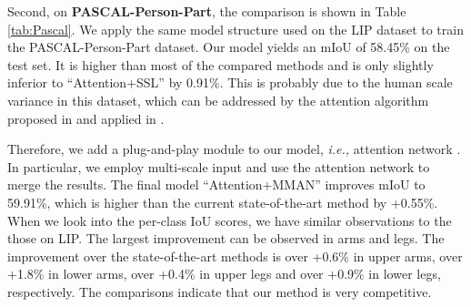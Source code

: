 \documentclass[runningheads]{llncs}
\begin{document}
Second, on \textbf{PASCAL-Person-Part}, the comparison is shown in Table \ref{tab:Pascal}. We apply the same model structure used on the LIP dataset to train the PASCAL-Person-Part dataset. Our model yields an mIoU of 58.45\% on the test set. It is higher than most of the compared methods and is only slightly inferior to  ``Attention+SSL'' \cite{gong2017look} by 0.91\%. This is probably due to the human scale variance in this dataset, which can be addressed by the attention algorithm proposed in \cite{chen2016attention} and applied in \cite{gong2017look}.

Therefore, we add a plug-and-play module to our model, \emph{i.e.,} attention network \cite{chen2016attention}. In particular, we employ multi-scale input and use the attention network to merge the results. The final model ``Attention+MMAN'' improves mIoU to 59.91\%,  which is higher than the current state-of-the-art method \cite{gong2017look} by +0.55\%. When we look into the per-class IoU scores, we have similar observations to the those on LIP. The largest improvement can be observed in arms and legs. The improvement over the state-of-the-art methods \cite{gong2017look,liang2016lgLSTM,chen2016attention} is over +0.6\% in upper arms,  over +1.8\% in lower arms,  over +0.4\% in upper legs and over +0.9\% in lower legs, respectively. The comparisons indicate that our method is very competitive.
\end{document}
